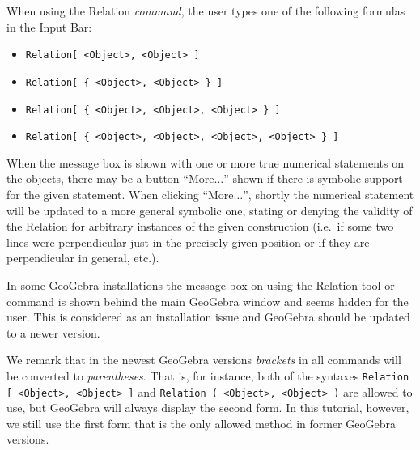 \documentclass{article}
\begin{document}
When using the Relation \textit{command}, the user types one of the following formulas in the Input Bar:
\begin{itemize}
    \item \texttt{Relation[ <Object>, <Object> ]}
    \item \texttt{Relation[ \{ <Object>, <Object> \} ]}
    \item \texttt{Relation[ \{ <Object>, <Object>, <Object> \} ]}
    \item \texttt{Relation[ \{ <Object>, <Object>, <Object>, <Object> \} ]}
\end{itemize}

When the message box is shown with one or more true numerical statements on the objects, there may be a button ``More$\ldots$'' shown if there is symbolic support for the given statement. When clicking ``More$\ldots$'', shortly the numerical statement will be updated to a more general symbolic one, stating or denying the validity of the Relation for arbitrary instances of the given construction (i.e.~if some two lines were perpendicular just in the precisely given position or if they are perpendicular in general, etc.).

In some GeoGebra installations the message box on using the Relation tool or command
is shown behind the main GeoGebra window and seems hidden for the user.
This is considered as an installation issue
and GeoGebra should be updated to a newer version.

We remark that in the newest GeoGebra versions \textit{brackets} in all commands will be converted to \textit{parentheses}.
That is, for instance, both of the syntaxes \texttt{Relation [ <Object>, <Object> ]} and 
\texttt{Relation ( <Object>, <Object> )} are allowed to use, but GeoGebra will always display
the second form. In this tutorial, however, we still use the first form that is the only allowed method
in former GeoGebra versions.
\end{document}
